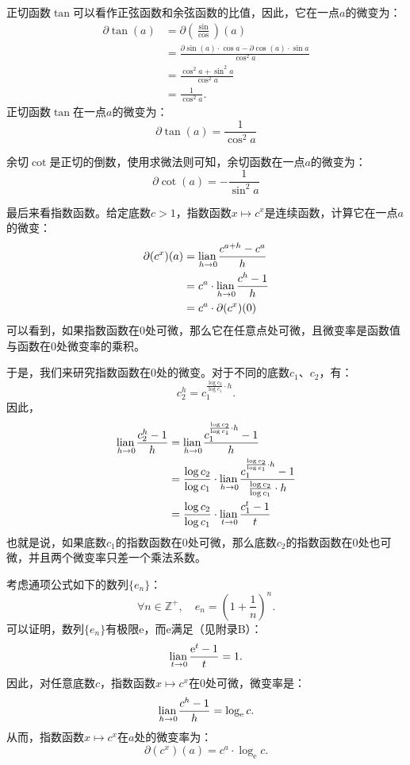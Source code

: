 \documentclass[12pt,UTF8,fontset=none]{ctexbook}
\begin{document}
正切函数$\tan$可以看作正弦函数和余弦函数的比值，因此，它在一点$a$的微变为：
\begin{align*}
    \partial \tan(a) &= \partial \left(\frac{\sin}{\cos}\right)(a)  \\
    &= \frac{\partial \sin(a) \cdot \cos{a} - \partial \cos(a) \cdot \sin{a}}{\cos^2{a}}  \\
    &= \frac{\cos^2{a} + \sin^2{a}}{\cos^2{a}}  \\
    &= \frac{1}{\cos^2{a}}.  
\end{align*}
正切函数$\tan$在一点$a$的微变为：
$$ \partial \tan(a) = \frac{1}{\cos^2{a}} $$

余切$\cot$是正切的倒数，使用求微法则可知，余切函数在一点$a$的微变为：
$$ \partial \cot(a) = -\frac{1}{\sin^2{a}} $$

最后来看指数函数。给定底数$c > 1$，指数函数$x\mapsto c^x$是连续函数，计算它在一点$a$的微变：
\begin{align*}
    \partial (c^x) (a) &= \underset{h\to 0}{\operatorname{lian}\,} \frac{c^{a+h} - c^a}{h}  \\
    &= c^a\cdot \underset{h\to 0}{\operatorname{lian}\,} \frac{c^h - 1}{h}  \\
    &= c^a \cdot \partial (c^x) (0) 
\end{align*}
可以看到，如果指数函数在$0$处可微，那么它在任意点处可微，且微变率是函数值与函数在$0$处微变率的乘积。

于是，我们来研究指数函数在$0$处的微变。对于不同的底数$c_1$、$c_2$，有：
$$c_2^h = c_1^{\frac{\log{c_2}}{\log{c_1}}\cdot h}.$$
因此，
\begin{align*}
    \underset{h\to 0}{\operatorname{lian}\,} \frac{c_2^h - 1}{h} &= \underset{h\to 0}{\operatorname{lian}\,} \frac{c_1^{\frac{\log{c_2}}{\log{c_1}}\cdot h} - 1}{h}  \\
    &= \frac{\log{c_2}}{\log{c_1}} \cdot \underset{h\to 0}{\operatorname{lian}\,} \frac{c_1^{\frac{\log{c_2}}{\log{c_1}}\cdot h} - 1}{\frac{\log{c_2}}{\log{c_1}} \cdot h}  \\
    &= \frac{\log{c_2}}{\log{c_1}} \cdot \underset{t\to 0}{\operatorname{lian}\,} \frac{c_1^{t} - 1}{t}  
\end{align*}
也就是说，如果底数$c_1$的指数函数在$0$处可微，那么底数$c_2$的指数函数在$0$处也可微，并且两个微变率只差一个乘法系数。

考虑通项公式如下的数列$\{e_n\}$：
$$ \forall n\in\mathbb{Z}^+,\quad e_n = \left(1 + \frac{1}{n}\right)^n.$$
可以证明，数列$\{e_n\}$有极限$\mathrm{e}$，而$\mathrm{e}$满足（见附录B）：
$$ \underset{t\to 0}{\operatorname{lian}\,} \frac{\mathrm{e}^{t} - 1}{t} = 1.$$
因此，对任意底数$c$，指数函数$x\mapsto c^x$在$0$处可微，微变率是：
$$ \underset{h\to 0}{\operatorname{lian}\,} \frac{c^h - 1}{h} = \log_{\mathrm{e}}{c}.$$
从而，指数函数$x\mapsto c^x$在$a$处的微变率为：
$$ \partial (c^x) (a) = c^a \cdot \log_{\mathrm{e}}{c}. $$
\end{document}
